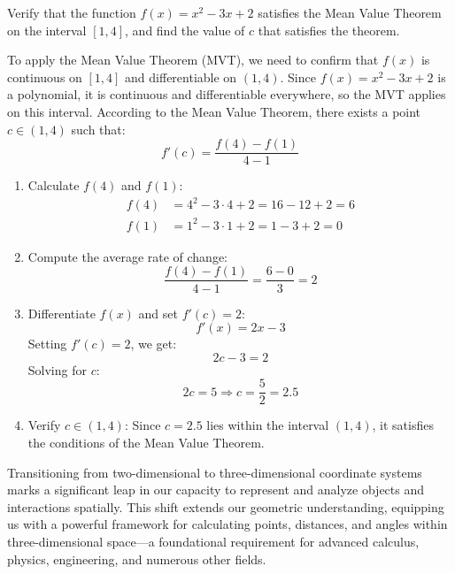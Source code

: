 \exampleline
\begin{example}
Verify that the function \( f(x) = x^2 - 3x + 2 \) satisfies the Mean Value Theorem on the interval \([1, 4]\), and find the value of \( c \) that satisfies the theorem.

\begin{solution}
To apply the Mean Value Theorem (MVT), we need to confirm that \( f(x) \) is continuous on \([1, 4]\) and differentiable on \((1, 4)\). Since \( f(x) = x^2 - 3x + 2 \) is a polynomial, it is continuous and differentiable everywhere, so the MVT applies on this interval. According to the Mean Value Theorem, there exists a point \( c \in (1, 4) \) such that:
\[
f'(c) = \frac{f(4) - f(1)}{4 - 1}
\]

\begin{enumerate}
    \item Calculate \( f(4) \) and \( f(1) \):
    \begin{align*}
    f(4) &= 4^2 - 3 \cdot 4 + 2 = 16 - 12 + 2 = 6 \\
    f(1) &= 1^2 - 3 \cdot 1 + 2 = 1 - 3 + 2 = 0
    \end{align*}

    \item Compute the average rate of change:
    \[
    \frac{f(4) - f(1)}{4 - 1} = \frac{6 - 0}{3} = 2
    \]

    \item Differentiate \( f(x) \) and set \( f'(c) = 2 \):
    \[
    f'(x) = 2x - 3
    \]
    Setting \( f'(c) = 2 \), we get:
    \[
    2c - 3 = 2
    \]
    Solving for \( c \):
    \[
    2c = 5 \Rightarrow c = \frac{5}{2} = 2.5
    \]

    \item Verify \( c \in (1, 4) \):
    Since \( c = 2.5 \) lies within the interval \((1, 4)\), it satisfies the conditions of the Mean Value Theorem.
\end{enumerate}

\end{solution}
\end{example}
\exampleline

\newpage


 

\noindent Transitioning from two-dimensional to three-dimensional coordinate systems marks a significant leap in our capacity to represent and analyze objects and interactions spatially. This shift extends our geometric understanding, equipping us with a powerful framework for calculating points, distances, and angles within three-dimensional space—a foundational requirement for advanced calculus, physics, engineering, and numerous other fields.

